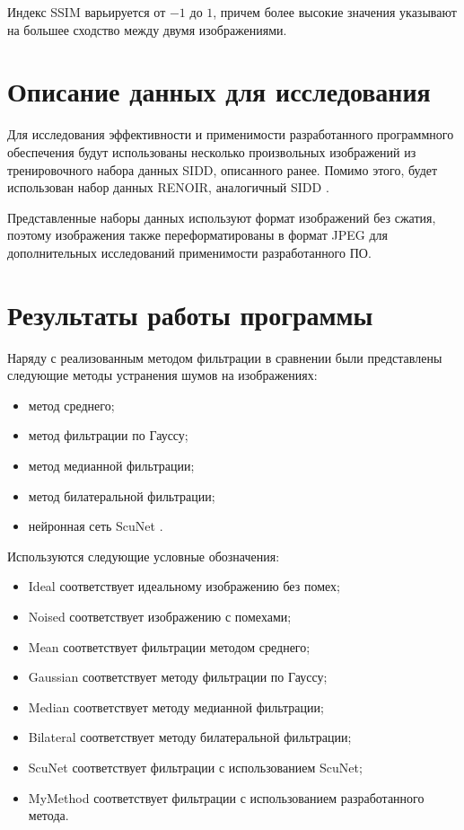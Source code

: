 Индекс SSIM варьируется от $-1$ до $1$, причем более высокие значения указывают на большее сходство между двумя изображениями.

\section{Описание данных для исследования}

Для исследования эффективности и применимости разработанного программного обеспечения будут использованы несколько произвольных изображений из тренировочного набора данных SIDD, описанного ранее. Помимо этого, будет использован набор данных RENOIR, аналогичный SIDD \cite{renoir}. 

Представленные наборы данных используют формат изображений без сжатия, поэтому изображения также переформатированы в формат JPEG для дополнительных исследований применимости разработанного ПО.

\section{Результаты работы программы}

Наряду с реализованным методом фильтрации в сравнении были представлены следующие методы устранения шумов на изображениях:
\begin{itemize}
    \item метод среднего;
    \item метод фильтрации по Гауссу;
    \item метод медианной фильтрации;
    \item метод билатеральной фильтрации;
    \item нейронная сеть ScuNet \cite{scunet}.
\end{itemize}

Используются следующие условные обозначения:
\begin{itemize}
    \item Ideal соответствует идеальному изображению без помех;
    \item Noised соответствует изображению с помехами;
    \item Mean соответствует фильтрации методом среднего;
    \item Gaussian соответствует методу фильтрации по Гауссу;
    \item Median соответствует методу медианной фильтрации;
    \item Bilateral соответствует методу билатеральной фильтрации;
    \item ScuNet соответствует фильтрации с использованием ScuNet;
    \item MyMethod соответствует фильтрации с использованием разработанного метода.
\end{itemize}

